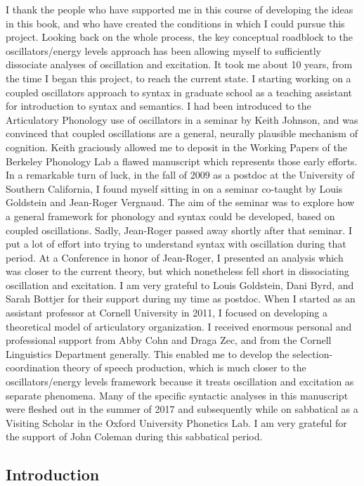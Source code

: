 I thank the people who have supported me in this course of developing the ideas in this book, and who have created the conditions in which I could pursue this project. Looking back on the whole process, the key conceptual roadblock to the oscillators/energy levels approach has been allowing myself to sufficiently dissociate analyses of oscillation and excitation. It took me about 10 years, from the time I began this project, to reach the current state. I starting working on a coupled oscillators approach to syntax in graduate school as a teaching assistant for introduction to syntax and semantics. I had been introduced to the Articulatory Phonology use of oscillators in a seminar by Keith Johnson, and was convinced that coupled oscillations are a general, neurally plausible mechanism of cognition. Keith graciously allowed me to deposit in the Working Papers of the Berkeley Phonology Lab a flawed manuscript which represents those early efforts. In a remarkable turn of luck, in the fall of 2009 as a postdoc at the University of Southern California, I found myself sitting in on a seminar co-taught by Louis Goldstein and Jean-Roger Vergnaud. The aim of the seminar was to explore how a general framework for phonology and syntax could be developed, based on coupled oscillations. Sadly, Jean-Roger passed away shortly after that seminar. I put a lot of effort into trying to understand syntax with oscillation during that period. At a Conference in honor of Jean-Roger, I presented an analysis which was closer to the current theory, but which nonetheless fell short in dissociating oscillation and excitation. I am very grateful to Louis Goldstein, Dani Byrd, and Sarah Bottjer for their support during my time as postdoc. When I started as an assistant professor at Cornell University in 2011, I focused on developing a theoretical model of articulatory organization. I received enormous personal and professional support from Abby Cohn and Draga Zec, and from the Cornell Linguistics Department generally. This enabled me to develop the selection-coordination theory of speech production, which is much closer to the oscillators/energy levels framework because it treats oscillation and excitation as separate phenomena. Many of the specific syntactic analyses in this manuscript were fleshed out in the summer of 2017 and subsequently while on sabbatical as a Visiting Scholar in the Oxford University Phonetics Lab. I am very grateful for the support of John Coleman during this sabbatical period.

\subsection{Introduction}

